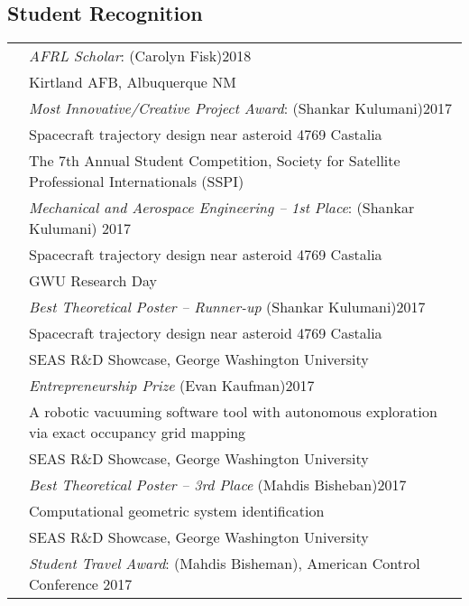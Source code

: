 \documentclass[10pt]{article}
\begin{document}
\vspace*{0.2cm}

\subsection*{Student Recognition}
\setlength{\tabcolsep}{0cm}
\begin{tabularx}{\textwidth}{>{\setlength{\hsize}{0.5cm}}X X}%
& \textit{AFRL Scholar}: (Carolyn Fisk)\hfill 2018\\
& Kirtland AFB, Albuquerque NM\\[0.2cm]

& \textit{Most Innovative/Creative Project Award}: (Shankar Kulumani)\hfill 2017\\
& {Spacecraft trajectory design near asteroid 4769 Castalia}\\
& The 7th Annual Student Competition, Society for Satellite Professional Internationals (SSPI)\\[0.2cm]

& \textit{Mechanical and Aerospace Engineering -- 1st Place}: (Shankar Kulumani) \hfill 2017\\
& {Spacecraft trajectory design near asteroid 4769 Castalia}\\
& GWU Research Day\\[0.2cm]


& \textit{Best Theoretical Poster -- Runner-up} (Shankar Kulumani)\hfill 2017\\
& Spacecraft trajectory design near asteroid 4769 Castalia\\
& SEAS R\&D Showcase, George Washington University\\[0.2cm]


& \textit{Entrepreneurship Prize} (Evan Kaufman)\hfill 2017\\
& A robotic vacuuming software tool with autonomous exploration via exact occupancy grid mapping\\
& SEAS R\&D Showcase, George Washington University\\[0.2cm]


& \textit{Best Theoretical Poster -- 3rd Place} (Mahdis Bisheban)\hfill 2017\\
& Computational geometric system identification\\
& SEAS R\&D Showcase, George Washington University\\[0.2cm]


& \textit{Student Travel Award}: (Mahdis Bisheman), {American Control Conference} \hfill 2017
\\[0.2cm]



\end{tabularx}
\end{document}
